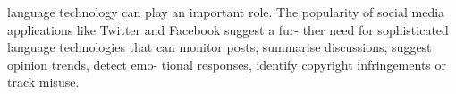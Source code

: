 \documentclass[]{../metanetpaper}
\begin{document}
language technology can play an important role.
The popularity of social media applications like Twitter and Facebook suggest a fur-
ther need for sophisticated language technologies that can monitor
posts, summarise discussions, suggest opinion trends, detect emo-
tional responses, identify copyright infringements or track misuse.
\end{document}
